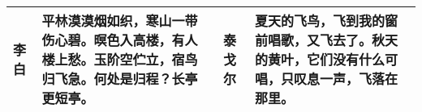 \centering
\begin{tabularx}{350pt}{lXlX}
  \toprule
  李白 & 平林漠漠烟如织，寒山一带伤心碧。暝色入高楼，有人楼上愁。玉阶空伫立，宿鸟归飞急。何处是归程？长亭更短亭。& 
  泰戈尔 & 夏天的飞鸟，飞到我的窗前唱歌，又飞去了。秋天的黄叶，它们没有什么可唱，只叹息一声，飞落在那里。\\
  \bottomrule
\end{tabularx}
